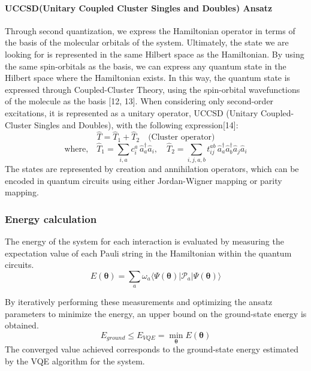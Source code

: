 \documentclass[pdflatex,sn-mathphys-num]{sn-jnl}%
\theoremstyle{thmstyleone}%
\theoremstyle{thmstyletwo}%
\theoremstyle{thmstylethree}%
\begin{document}
\paragraph{UCCSD(Unitary Coupled Cluster Singles and Doubles) Ansatz} \leavevmode \newline
Through second quantization, we express the Hamiltonian operator in terms of the basis of the molecular orbitals of the system. Ultimately, the state we are looking for is represented in the same Hilbert space as the Hamiltonian. By using the same spin-orbitals as the basis, we can express any quantum state in the Hilbert space where the Hamiltonian exists. In this way, the quantum state is expressed through Coupled-Cluster Theory, using the spin-orbital wavefunctions of the molecule as the basis [12, 13]. When considering only second-order excitations, it is represented as a unitary operator, UCCSD (Unitary Coupled-Cluster Singles and Doubles), with the following expression[14]:
\begin{equation*}
\hat{T} = \hat{T}_1 + \hat{T}_2 \quad \text{(Cluster operator)}
\end{equation*}
\begin{equation*}
\text{where,} \quad 
\hat{T}_1 = \sum_{i,a} c_i^a \, \hat{a}_a^{\dagger} \hat{a}_i, \quad
\hat{T}_2 = \sum_{i,j,a,b} t_{ij}^{ab} \, \hat{a}_a^{\dagger} \hat{a}_b^{\dagger} \hat{a}_j \hat{a}_i
\end{equation*}
The states are represented by creation and annihilation operators, which can be encoded in quantum circuits using either Jordan-Wigner mapping or parity mapping. 

\subsubsection{Energy calculation}\label{subsec2.2.3}

The energy of the system for each interaction is evaluated by measuring the expectation value of each Pauli string in the Hamiltonian within the quantum circuits. 
\begin{equation}
E(\mathbf{\theta}) = \sum_{a} \omega_a \langle \Psi(\mathbf{\theta}) \vert \mathcal{P}_a \vert \Psi(\mathbf{\theta}) \rangle
\end{equation}

By iteratively performing these measurements and optimizing the ansatz parameters to minimize the energy,
an upper bound on the ground-state energy is obtained. 
\begin{equation}
E_{ground}\leq E_{VQE} = \min_{\mathbf{\theta}} E(\mathbf{\theta})
\end{equation}
The converged  value achieved corresponds to the ground-state energy estimated by the VQE algorithm for the system.
\end{document}
